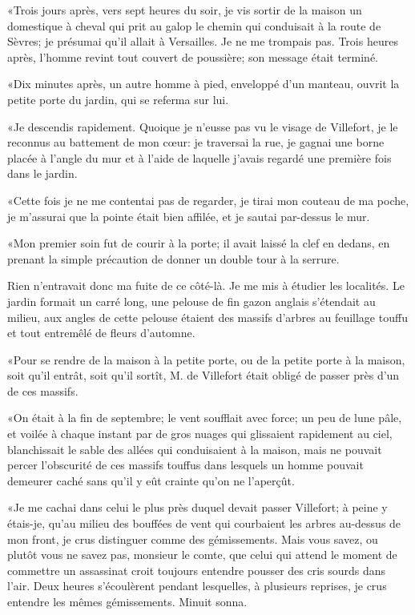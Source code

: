 «Trois jours après, vers sept heures du soir, je vis sortir de la maison un domestique à cheval qui prit au galop le chemin qui conduisait à la route de Sèvres; je présumai qu'il allait à Versailles. Je ne me trompais pas. Trois heures après, l'homme revint tout couvert de poussière; son message était terminé. 

«Dix minutes après, un autre homme à pied, enveloppé d'un manteau, ouvrit la petite porte du jardin, qui se referma sur lui. 

«Je descendis rapidement. Quoique je n'eusse pas vu le visage de Villefort, je le reconnus au battement de mon cœur: je traversai la rue, je gagnai une borne placée à l'angle du mur et à l'aide de laquelle j'avais regardé une première fois dans le jardin. 

«Cette fois je ne me contentai pas de regarder, je tirai mon couteau de ma poche, je m'assurai que la pointe était bien affilée, et je sautai par-dessus le mur. 

«Mon premier soin fut de courir à la porte; il avait laissé la clef en dedans, en prenant la simple précaution de donner un double tour à la serrure. 

Rien n'entravait donc ma fuite de ce côté-là. Je me mis à étudier les localités. Le jardin formait un carré long, une pelouse de fin gazon anglais s'étendait au milieu, aux angles de cette pelouse étaient des massifs d'arbres au feuillage touffu et tout entremêlé de fleurs d'automne. 

«Pour se rendre de la maison à la petite porte, ou de la petite porte à la maison, soit qu'il entrât, soit qu'il sortît, M. de Villefort était obligé de passer près d'un de ces massifs.  

«On était à la fin de septembre; le vent soufflait avec force; un peu de lune pâle, et voilée à chaque instant par de gros nuages qui glissaient rapidement au ciel, blanchissait le sable des allées qui conduisaient à la maison, mais ne pouvait percer l'obscurité de ces massifs touffus dans lesquels un homme pouvait demeurer caché sans qu'il y eût crainte qu'on ne l'aperçût. 

«Je me cachai dans celui le plus près duquel devait passer Villefort; à peine y étais-je, qu'au milieu des bouffées de vent qui courbaient les arbres au-dessus de mon front, je crus distinguer comme des gémissements. Mais vous savez, ou plutôt vous ne savez pas, monsieur le comte, que celui qui attend le moment de commettre un assassinat croit toujours entendre pousser des cris sourds dans l'air. Deux heures s'écoulèrent pendant lesquelles, à plusieurs reprises, je crus entendre les mêmes gémissements. Minuit sonna. 

